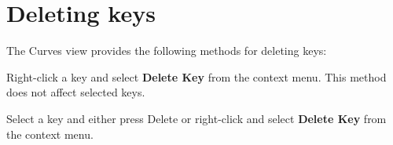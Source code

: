 \chapter{Deleting keys}
\hypertarget{md__library_2_package_cache_2com_8unity_8timeline_0d1_87_86_2_documentation_0i_2crv__keys__del}{}\label{md__library_2_package_cache_2com_8unity_8timeline_0d1_87_86_2_documentation_0i_2crv__keys__del}
\label{md__library_2_package_cache_2com_8unity_8timeline_0d1_87_86_2_documentation_0i_2crv__keys__del_autotoc_md1137}%
%
 The Curves view provides the following methods for deleting keys\+:


\begin{DoxyItemize}
\item Right-\/click a key and select {\bfseries{Delete Key}} from the context menu. This method does not affect selected keys.
\item Select a key and either press Delete or right-\/click and select {\bfseries{Delete Key}} from the context menu. 
\end{DoxyItemize}